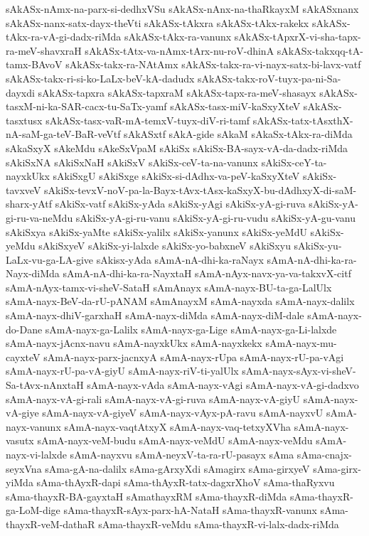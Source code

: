{sAkASx-nAmx-na-parx-si-dedhxVSu
sAkASx-nAnx-na-thaRkayxM
sAkASxnanx
sAkASx-nanx-satx-dayx-theVti
sAkASx-tAkxra
sAkASx-tAkx-rakekx
sAkASx-tAkx-ra-vA-gi-dadx-riMda
sAkASx-tAkx-ra-vanunx
sAkASx-tApxrX-vi-sha-tapx-ra-meV-shavxraH
sAkASx-tAtx-va-nAmx-tArx-nu-roV-dhinA
sAkASx-takxqq-tA-tamx-BAvoV
sAkASx-takx-ra-NAtAmx
sAkASx-takx-ra-vi-nayx-satx-bi-lavx-vatf
sAkASx-takx-ri-si-ko-LaLx-beV-kA-dadudx
sAkASx-takx-roV-tuyx-pa-ni-Sa-dayxdi
sAkASx-tapxra
sAkASx-tapxraM
sAkASx-tapx-ra-meV-shasayx
sAkASx-tasxM-ni-ka-SAR-cacx-tu-SaTx-yamf
sAkASx-tasx-miV-kaSxyXteV
sAkASx-tasxtusx
sAkASx-tasx-vaR-mA-temxV-tuyx-diV-ri-tamf
sAkASx-tatx-tAsxthX-nA-saM-ga-teV-BaR-veVtf
sAkASxtf
sAkA-gide
sAkaM
sAkaSx-tAkx-ra-diMda
sAkaSxyX
sAkeMdu
sAkeSxVpaM
sAkiSx
sAkiSx-BA-sayx-vA-da-dadx-riMda
sAkiSxNA
sAkiSxNaH
sAkiSxV
sAkiSx-ceV-ta-na-vanunx
sAkiSx-ceY-ta-nayxkUkx
sAkiSxgU
sAkiSxge
sAkiSx-si-dAdhx-va-peV-kaSxyXteV
sAkiSx-tavxveV
sAkiSx-tevxV-noV-pa-la-Bayx-tAvx-tAsx-kaSxyX-bu-dAdhxyX-di-saM-sharx-yAtf
sAkiSx-vatf
sAkiSx-yAda
sAkiSx-yAgi
sAkiSx-yA-gi-ruva
sAkiSx-yA-gi-ru-va-neMdu
sAkiSx-yA-gi-ru-vanu
sAkiSx-yA-gi-ru-vudu
sAkiSx-yA-gu-vanu
sAkiSxya
sAkiSx-yaMte
sAkiSx-yalilx
sAkiSx-yanunx
sAkiSx-yeMdU
sAkiSx-yeMdu
sAkiSxyeV
sAkiSx-yi-lalxde
sAkiSx-yo-babxneV
sAkiSxyu
sAkiSx-yu-LaLx-vu-ga-LA-give
sAkisx-yAda
sAmA-nA-dhi-ka-raNayx
sAmA-nA-dhi-ka-ra-Nayx-diMda
sAmA-nA-dhi-ka-ra-NayxtaH
sAmA-nAyx-navx-ya-va-takxvX-citf
sAmA-nAyx-tamx-vi-sheV-SataH
sAmAnayx
sAmA-nayx-BU-ta-ga-LalUlx
sAmA-nayx-BeV-da-rU-pANAM
sAmAnayxM
sAmA-nayxda
sAmA-nayx-dalilx
sAmA-nayx-dhiV-garxhaH
sAmA-nayx-diMda
sAmA-nayx-diM-dale
sAmA-nayx-do-Dane
sAmA-nayx-ga-Lalilx
sAmA-nayx-ga-Lige
sAmA-nayx-ga-Li-lalxde
sAmA-nayx-jAcnx-navu
sAmA-nayxkUkx
sAmA-nayxkekx
sAmA-nayx-mu-cayxteV
sAmA-nayx-parx-jacnxyA
sAmA-nayx-rUpa
sAmA-nayx-rU-pa-vAgi
sAmA-nayx-rU-pa-vA-giyU
sAmA-nayx-riV-ti-yalUlx
sAmA-nayx-sAyx-vi-sheV-Sa-tAvx-nAnxtaH
sAmA-nayx-vAda
sAmA-nayx-vAgi
sAmA-nayx-vA-gi-dadxvo
sAmA-nayx-vA-gi-rali
sAmA-nayx-vA-gi-ruva
sAmA-nayx-vA-giyU
sAmA-nayx-vA-giye
sAmA-nayx-vA-giyeV
sAmA-nayx-vAyx-pA-ravu
sAmA-nayxvU
sAmA-nayx-vanunx
sAmA-nayx-vaqtAtxyX
sAmA-nayx-vaq-tetxyXVha
sAmA-nayx-vasutx
sAmA-nayx-veM-budu
sAmA-nayx-veMdU
sAmA-nayx-veMdu
sAmA-nayx-vi-lalxde
sAmA-nayxvu
sAmA-neyxV-ta-ra-rU-pasayx
sAma
sAma-cnajx-seyxVna
sAma-gA-na-dalilx
sAma-gArxyXdi
sAmagirx
sAma-girxyeV
sAma-girx-yiMda
sAma-thAyxR-dapi
sAma-thAyxR-tatx-dagxrXhoV
sAma-thaRyxvu
sAma-thayxR-BA-gayxtaH
sAmathayxRM
sAma-thayxR-diMda
sAma-thayxR-ga-LoM-dige
sAma-thayxR-sAyx-parx-hA-NataH
sAma-thayxR-vanunx
sAma-thayxR-veM-dathaR
sAma-thayxR-veMdu
sAma-thayxR-vi-lalx-dadx-riMda
}
